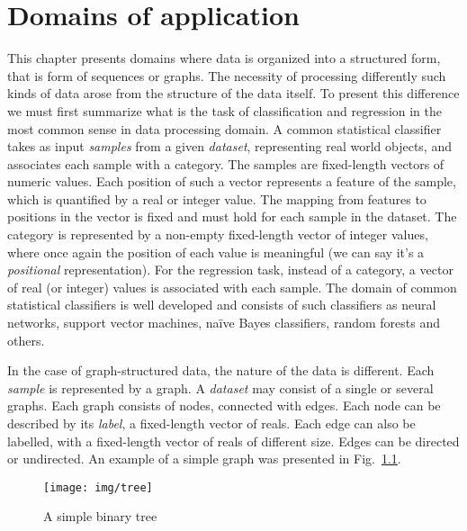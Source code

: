 
\chapter{Domains of application}
This chapter presents domains where data is organized into a structured form, that is form of sequences or graphs. The necessity of processing differently such kinds of data arose from the structure of the data itself. To present this difference we must first summarize what is the task of classification and regression in the most common sense in data processing domain. A common statistical classifier takes as input \emph{samples} from a given \emph{dataset}, representing real world objects, and associates each sample with a category. The samples are fixed-length vectors of numeric values. Each position of such a vector represents a feature of the sample, which is quantified by a real or integer value. The mapping from features to positions in the vector is fixed and must hold for each sample in the dataset. The category is represented by a non-empty fixed-length vector of integer values, where once again the position of each value is meaningful (we can say it's a \emph{positional} representation). For the regression task, instead of a category, a vector of real (or integer) values is associated with each sample. The domain of common statistical classifiers is well developed and consists of such classifiers as neural networks, support vector machines, naïve Bayes classifiers, random forests and others.

In the case of graph-structured data, the nature of the data is different. Each \emph{sample} is represented by a graph. A \emph{dataset} may consist of a single or several graphs. Each graph consists of nodes, connected with edges. Each node can be described by its \emph{label}, a fixed-length vector of reals. Each edge can also be labelled, with a fixed-length vector of reals of different size. Edges can be directed or undirected. An example of a simple graph was presented in Fig.~\ref{fig:simple_tree}.

\begin{figure}
\begin{center}
	\texttt{[image: img/tree]}
	\caption{A simple binary tree}
	\label{fig:simple_tree}
\end{center}
\end{figure}

